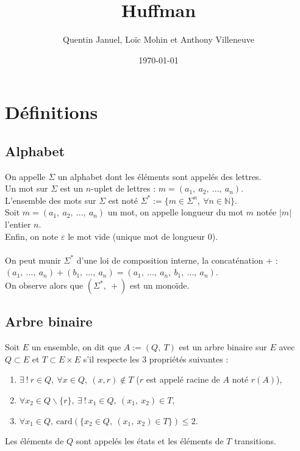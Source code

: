 \documentclass[a4paper, 12pt]{article}
\title{Huffman}
\author{Quentin Januel, Loïc Mohin et Anthony Villeneuve}
\date{\today}
\begin{document}
\maketitle
\newpage

\tableofcontents{}
\newpage

\section{Définitions}

\subsection{Alphabet}
On appelle $\Sigma$ un alphabet dont les éléments sont appelés des lettres. \\
Un mot sur $\Sigma$ est un $n$-uplet de lettres : $m = (a_1,\ a_2,\ ...,\ a_n)$. \\
L'ensemble des mots sur $\Sigma$ est noté $\Sigma^* := \{m \in \Sigma^n,\ \forall n \in \mathbb{N}\}$. \\
Soit $m = (a_1,\ a_2,\ ...,\ a_n)$ un mot, on appelle longueur du mot $m$ notée $|m|$ l'entier $n$. \\
Enfin, on note $\varepsilon$ le mot vide (unique mot de longueur $0$). \\ \\
On peut munir $\Sigma^*$ d'une loi de composition interne, la concaténation $+$ : \\
$(a_1,\ ...,\ a_n)+(b_1,\ ...,\ a_n) = (a_1,\ ...,\ a_n,\ b_1,\ ...,\ a_n)$. \\
On observe alors que $(\Sigma^*,\ +)$ est un monoïde.

\subsection{Arbre binaire}
Soit $E$ un ensemble, on dit que $A := (Q,\ T)$ est un arbre binaire sur $E$ avec $Q \subset E$ et $T \subset E\times E$ s'il respecte les 3 propriétés suivantes :
\begin{enumerate}
\item $\exists \ !\ r \in Q,\ \forall x \in Q,\ (x, r) \notin T$ ($r$ est appelé racine de $A$ noté $r(A)$),
\item $\forall x_2 \in Q\backslash\{r\},\ \exists \ !\ x_1 \in Q,\ (x_1,\ x_2) \in T$,
\item $\forall x_1 \in Q,\ \text{card}(\{x_2 \in Q,\ (x_1,\ x_2)\in T\}) \leq 2$.
\end{enumerate}
Les éléments de $Q$ sont appelés les états et les éléments de $T$ transitions.
\end{document}

